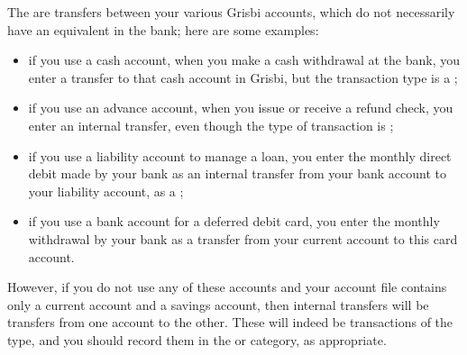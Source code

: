 The  are transfers between your various Grisbi accounts, which do not necessarily have an equivalent in the bank; here are some examples:

\begin{itemize}
	\item if you use a cash account, when you make a cash withdrawal at the bank, you enter a transfer to that cash account in Grisbi, but the transaction type is a ;
	\item if you use an advance account, when you issue or receive a refund check, you enter an internal transfer, even though the type of transaction is ;
	\item if you use a liability account to manage a loan, you enter the monthly direct debit made by your bank as an internal transfer from your bank account to your liability account, as a ;
	\item if you use a bank account for a deferred debit card, you enter the monthly withdrawal by your bank as a transfer from your current account to this card account.
\end{itemize}

However, if you do not use any of these accounts and your account file contains only a current account and a savings account, then internal transfers will be transfers from one account to the other. These will indeed be transactions of the  type, and you should record them in the  or  category, as appropriate.

